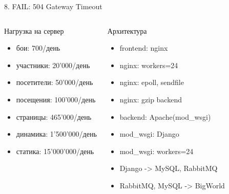 \documentclass{beamer}
\begin{document}
\begin{frame}{8. FAIL: 504 Gateway Timeout}
    \begin{columns}
            \begin{block}{Нагрузка на сервер}
                \begin{itemize}
                    \item{бои: 700/день}
                    \item{участники: 20'000/день}
                    \item{посетители: 50'000/день}
                    \item{посещения: 100'000/день}
                    \item{страницы: 465'000/день}
                    \item{динамика: 1'500'000/день}
                    \item{статика: 15'000'000/день}
                \end{itemize}
            \end{block}

        \pause
            \begin{block}{Архитектура}
                \begin{itemize}
                    \item{frontend: nginx}
                    \item{nginx: workers=24}
                    \item{nginx: epoll, sendfile}
                    \item{nginx: gzip backend}
                    \item{backend: Apache(mod\_wsgi)}
                    \item{mod\_wsgi: Django}
                    \item{mod\_wsgi: workers=24}
                    \item{Django -> MySQL, RabbitMQ}
                    \item{RabbitMQ, MySQL -> BigWorld}
                \end{itemize}
            \end{block}
    \end{columns}
\end{frame}
\end{document}
